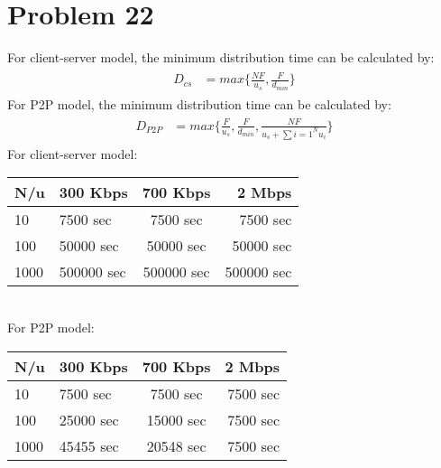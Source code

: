 \documentclass[titlepage, paper=a4, fontsize=11pt]{scrartcl} %
\numberwithin{equation}{section} %
\numberwithin{figure}{section} %
\numberwithin{table}{section} %
\begin{document}

\section*{Problem 22}
For client-server model, the minimum distribution time can be calculated by:
\begin{align*} 
\begin{split}
D_{cs} &= max\{ \frac{NF}{u_s}, \frac{F}{d_{min}} \}
\end{split}					
\end{align*}
For P2P model, the minimum distribution time can be calculated by:
\begin{align*} 
\begin{split}
D_{P2P} &= max\{ \frac{F}{u_s}, \frac{F}{d_{min}}, \frac{NF}{u_s + \sum \limits{i=1}^N u_i} \}
\end{split}					
\end{align*}
For client-server model:
\begin{table}[h!]
  \begin{center}
    \label{tab:table1}
    \begin{tabular}{ l | l | c | r }
      N/u & 300 Kbps & 700 Kbps & 2 Mbps \\
      \hline
      10 & 7500 sec & 7500 sec & 7500 sec \\
      \hline
      100 & 50000 sec & 50000 sec & 50000 sec \\
      \hline
      1000 & 500000 sec & 500000 sec & 500000 sec \\
    \end{tabular}
  \end{center}
\end{table}
\\
For P2P model:
\begin{table}[h!]
  \begin{center}
    \label{tab:table1}
    \begin{tabular}{ l | l | c | r }
      N/u & 300 Kbps & 700 Kbps & 2 Mbps \\
      \hline
      10 & 7500 sec & 7500 sec & 7500 sec \\
      \hline
      100 & 25000 sec & 15000 sec & 7500 sec \\
      \hline
      1000 & 45455 sec & 20548 sec & 7500 sec \\
    \end{tabular}
  \end{center}
\end{table}
\\
\end{document}
